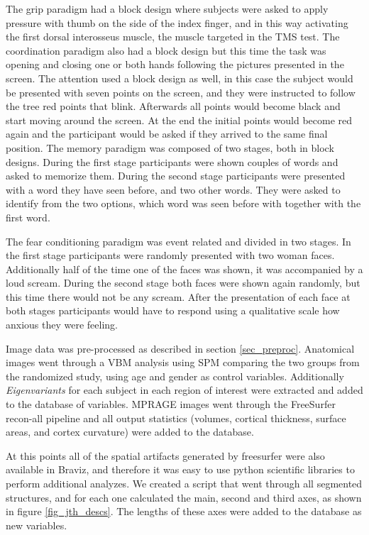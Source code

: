 The grip paradigm had a block design where subjects were asked to apply pressure with thumb on the side of the index finger, and in this way activating the first dorsal interosseus muscle, the muscle targeted in the TMS test. The coordination paradigm also had a block design but this time the task was opening and closing one or both hands following the pictures presented in the screen. The attention used a block design as well, in this case the subject would be presented with seven points on the screen, and they were instructed to follow the tree red points that blink. Afterwards all points would become black and start moving around the screen. At the end the initial points would become red again and the participant would be asked if they arrived to the same final position. 
The memory paradigm was composed of two stages, both in block designs. During the first stage participants were shown couples of words and asked to memorize them. During the second stage participants were presented with a word they have seen before, and two other words. They were asked to identify from the two options, which word was seen before with together with the first word.


The fear conditioning paradigm was event related and divided in two stages. In the first stage participants were randomly presented with two woman faces. Additionally half of the time one of the faces was shown, it was accompanied by a loud scream.  During the second stage  both faces were shown again randomly, but this time there would not be any scream. After the presentation of each face at both stages participants would have to respond using a qualitative scale how anxious they were feeling.
\smallskip

Image data was pre-processed as described in section \ref{sec_preproc}. Anatomical images went through a VBM analysis using SPM comparing the two groups from the randomized study, using age and gender as control variables. Additionally \emph{Eigenvariants} for each subject in each region of interest were extracted and added to the database of variables. MPRAGE images went through the FreeSurfer recon-all pipeline and all output statistics (volumes, cortical thickness, surface areas, and cortex curvature) were added to the database. 

At this points all of the spatial artifacts generated by freesurfer were also available in Braviz, and therefore it was easy to use python scientific libraries to perform additional analyzes. We created a script that went through all segmented structures, and for each one calculated the main, second and third axes, as shown in figure \ref{fig_jth_descs}. The lengths of these axes were added to the database as new variables.

